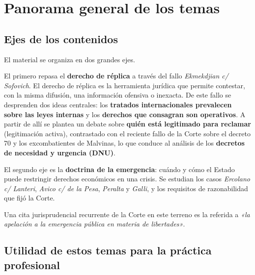 \documentclass[12pt,oneside]{book}
\begin{document}
\tableofcontents


\chapter[Panorama general]{Panorama general de los temas}

\section{Ejes de los contenidos}

El material se organiza en dos grandes ejes.

El primero repasa el \textbf{derecho de réplica} a través del fallo \textit{Ekmekdjian c/ Sofovich}. El derecho de réplica es la herramienta jurídica que permite contestar, con la misma difusión, una información ofensiva o inexacta. De este fallo se desprenden dos ideas centrales: los \textbf{tratados internacionales prevalecen sobre las leyes internas} y los \textbf{derechos que consagran son operativos}. A partir de allí se plantea un debate sobre \textbf{quién está legitimado para reclamar} (legitimación activa), contrastado con el reciente fallo de la Corte sobre el decreto 70 y los excombatientes de Malvinas, lo que conduce al análisis de los \textbf{decretos de necesidad y urgencia (DNU)}.

El segundo eje es la \textbf{doctrina de la emergencia}: cuándo y cómo el Estado puede restringir derechos económicos en una crisis. Se estudian los casos \textit{Ercolano c/ Lanteri}, \textit{Avico c/ de la Pesa}, \textit{Peralta} y \textit{Galli}, y los requisitos de razonabilidad que fijó la Corte.

Una cita jurisprudencial recurrente de la Corte en este terreno es la referida a \textit{«la apelación a la emergencia pública en materia de libertades»}.

\section{Utilidad de estos temas para la práctica profesional}
\end{document}
